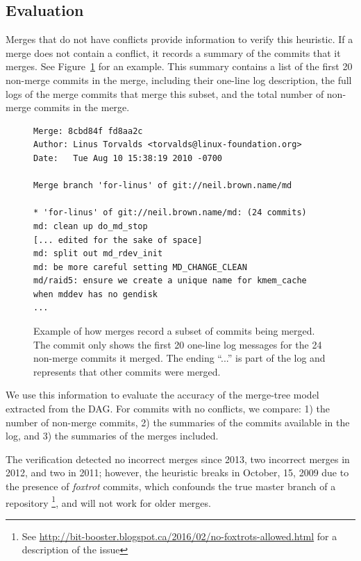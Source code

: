 \documentclass[conference, draftclsnofoot, draft]{IEEEtran}
\begin{document}
\subsection{Evaluation}

Merges that do not have conflicts provide information to verify this heuristic. If a
merge does not contain a conflict, it records a summary of the commits that it
merges. See Figure~\ref{fig:sampleMerge} for an example. This summary contains a
list of the first 20 non-merge commits in the merge, including their one-line log
description, the full logs of the merge commits that merge this subset, and the
total number of non-merge commits in the merge.

\begin{figure}[htbp]
        \centering
        {\tiny
        \begin{verbatim}
Merge: 8cbd84f fd8aa2c
Author: Linus Torvalds <torvalds@linux-foundation.org>
Date:   Tue Aug 10 15:38:19 2010 -0700

Merge branch 'for-linus' of git://neil.brown.name/md

* 'for-linus' of git://neil.brown.name/md: (24 commits)
md: clean up do_md_stop
[... edited for the sake of space]
md: split out md_rdev_init
md: be more careful setting MD_CHANGE_CLEAN
md/raid5: ensure we create a unique name for kmem_cache when mddev has no gendisk
...
        \end{verbatim}}
        \caption{Example of how merges record a subset of commits being merged. The
                commit only shows the first 20 one-line log messages for the 24
                non-merge commits it merged. The ending ``...'' is part of the log
                and represents that other commits were merged.}
        \label{fig:sampleMerge}
\end{figure}

We use this information to evaluate the accuracy of the merge-tree model extracted
from the DAG. For commits with no conflicts, we compare: 1) the number of non-merge
commits, 2) the summaries of the commits available in the log, and 3) the summaries
of the merges included.


The verification detected no incorrect merges since 2013, two incorrect merges in
2012, and two in 2011; however, the heuristic breaks in October, 15, 2009 due to the
presence of \textit{foxtrot} commits, which confounds the true master branch of a
repository
\footnote{See \url{http://bit-booster.blogspot.ca/2016/02/no-foxtrots-allowed.html} for a description of the issue}, and will not work for older merges.
\end{document}
